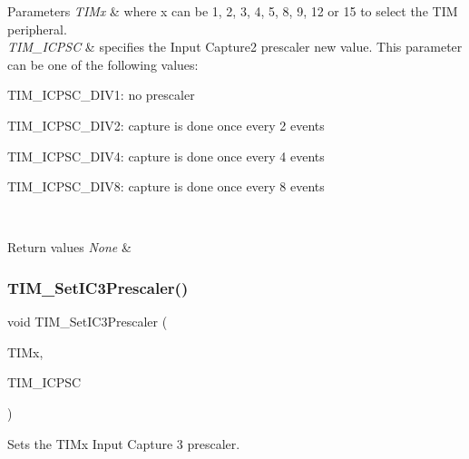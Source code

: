 \begin{DoxyParams}{Parameters}
{\em T\+I\+Mx} & where x can be 1, 2, 3, 4, 5, 8, 9, 12 or 15 to select the T\+IM peripheral. \\
\hline
{\em T\+I\+M\+\_\+\+I\+C\+P\+SC} & specifies the Input Capture2 prescaler new value. This parameter can be one of the following values\+: \begin{DoxyItemize}
\item T\+I\+M\+\_\+\+I\+C\+P\+S\+C\+\_\+\+D\+I\+V1\+: no prescaler \item T\+I\+M\+\_\+\+I\+C\+P\+S\+C\+\_\+\+D\+I\+V2\+: capture is done once every 2 events \item T\+I\+M\+\_\+\+I\+C\+P\+S\+C\+\_\+\+D\+I\+V4\+: capture is done once every 4 events \item T\+I\+M\+\_\+\+I\+C\+P\+S\+C\+\_\+\+D\+I\+V8\+: capture is done once every 8 events \end{DoxyItemize}
\\
\hline
\end{DoxyParams}

\begin{DoxyRetVals}{Return values}
{\em None} & \\
\hline
\end{DoxyRetVals}
\mbox{\label{group___t_i_m___exported___functions_ga76f906383b8132ebe00dffadb70cf7f9}} 
\subsubsection{\texorpdfstring{TIM\_SetIC3Prescaler()}{TIM\_SetIC3Prescaler()}}
{\footnotesize\ttfamily void T\+I\+M\+\_\+\+Set\+I\+C3\+Prescaler (\begin{DoxyParamCaption}\item[{\mbox{\hyperlink{struct_t_i_m___type_def}{T\+I\+M\+\_\+\+Type\+Def}} $\ast$}]{T\+I\+Mx,  }\item[{uint16\+\_\+t}]{T\+I\+M\+\_\+\+I\+C\+P\+SC }\end{DoxyParamCaption})}



Sets the T\+I\+Mx Input Capture 3 prescaler. 


